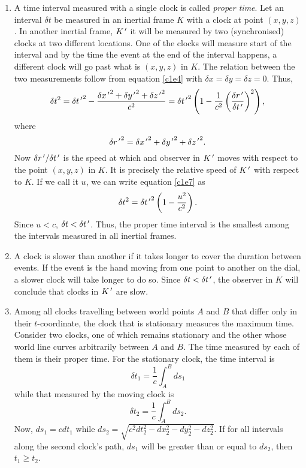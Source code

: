 \begin{enumerate}
\item A time interval measured with a single clock is called
\emph{proper time}. Let an interval $\delta t$ be measured in an inertial frame
$K$ with a clock at point $(x, y, z)$. In another inertial frame, $K^{\,\prime}$ it will
be measured by two (synchronised) clocks at two different locations. One of the
clocks will measure start of the interval and by the time the event at the end 
of the interval happens, a different clock will go past what is $(x, y, z)$ in
$K$. The relation between the two measurements follow from equation \eqref{c1e4}
with $\delta x = \delta y = \delta z = 0$. Thus,
\begin{equation}\label{c1e7}
\delta t^2 = \delta {t^{\,\prime}}^2 - \frac{\delta {x^{\,\prime}}^2 + \delta {y^{\,\prime}}^2 + \delta {z^{\,\prime}}^2}{c^2}
= \delta {t^{\,\prime}}^2\left(1 - \frac{1}{c^2}\left(\frac{\delta r^{\,\prime}}{\delta t^{\,\prime}}\right)^2\right),
\end{equation}
where
\begin{equation}\label{c1e8}
\delta {r^{\,\prime}}^2 = \delta {x^{\,\prime}}^2 + \delta {y^{\,\prime}}^2 + \delta {z^{\,\prime}}^2.
\end{equation}
Now $\delta r^{\,\prime}/\delta t^{\,\prime}$ is the speed at which and observer in $K^{\,\prime}$
moves with respect to the point $(x, y, z)$ in $K$. It is precisely the relative
speed of $K^{\,\prime}$ with respect to $K$. If we call it $u$, we can write equation
\eqref{c1e7} as
\begin{equation}\label{c1e9}
\delta t^2 = \delta {t^{\,\prime}}^2\left(1 - \frac{u^2}{c^2}\right).
\end{equation}
Since $u < c$, $\delta t < \delta t^{\,\prime}$. Thus, the proper time interval is the
smallest among the intervals measured in all inertial frames.

\item A clock is slower than another if it takes longer to cover the duration
between events. If the event is the hand moving from one point to another on
the dial, a slower clock will take longer to do so. Since $\delta t < \delta
t^{\,\prime}$, the observer in $K$ will conclude that clocks in $K^{\,\prime}$ are slow.

\item Among all clocks travelling between world points $A$ and $B$ that differ 
only in their $t$-coordinate, the clock that is stationary measures the maximum
time. Consider two clocks, one of which remains stationary and the other whose
world line curves arbitrarily between $A$ and $B$. The time measured by each of
them is their proper time. For the stationary clock, the time interval is
\begin{equation}\label{c1e10}
\delta t_1 = \frac{1}{c}\int_A^B ds_1
\end{equation}
while that measured by the moving clock is
\begin{equation}\label{c1e11}
\delta t_2 = \frac{1}{c}\int_A^B ds_2.
\end{equation}
Now, $ds_1 = cdt_1$ while $ds_2 = \sqrt{c^2dt_2^2 - dx_2^2 - dy_2^2 - dz_2^2}$.
If for all intervals along the second clock's path, $ds_1$ will be greater
than or equal to $ds_2$, then $t_1 \ge t_2$.


\end{enumerate}
